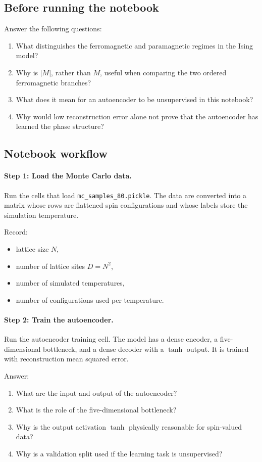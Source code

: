 \subsection*{Before running the notebook}
Answer the following questions:
\begin{enumerate}
    \item What distinguishes the ferromagnetic and paramagnetic regimes in the Ising model?
    \item Why is \(|M|\), rather than \(M\), useful when comparing the two ordered ferromagnetic branches?
    \item What does it mean for an autoencoder to be unsupervised in this notebook?
    \item Why would low reconstruction error alone not prove that the autoencoder has learned the phase structure?
\end{enumerate}

\subsection*{Notebook workflow}

\paragraph{Step 1: Load the Monte Carlo data.}
Run the cells that load \texttt{mc\_samples\_80.pickle}. The data are converted into a matrix whose rows are flattened spin configurations and whose labels store the simulation temperature.

Record:
\begin{itemize}
    \item lattice size \(N\),
    \item number of lattice sites \(D=N^2\),
    \item number of simulated temperatures,
    \item number of configurations used per temperature.
\end{itemize}

\paragraph{Step 2: Train the autoencoder.}
Run the autoencoder training cell. The model has a dense encoder, a five-dimensional bottleneck, and a dense decoder with a \(\tanh\) output. It is trained with reconstruction mean squared error.

Answer:
\begin{enumerate}
    \item What are the input and output of the autoencoder?
    \item What is the role of the five-dimensional bottleneck?
    \item Why is the output activation \(\tanh\) physically reasonable for spin-valued data?
    \item Why is a validation split used if the learning task is unsupervised?
\end{enumerate}

